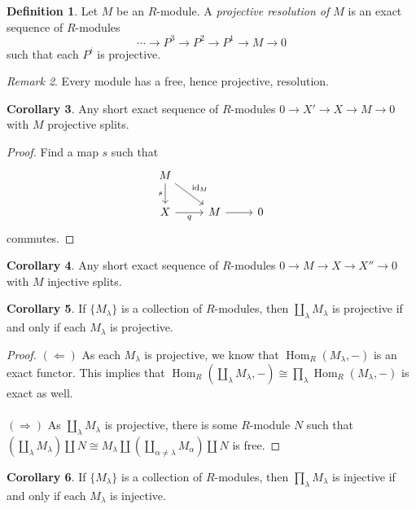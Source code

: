 \documentclass[10pt,letterpaper,cm]{nupset}
\theoremstyle{definition}
\newtheorem{definition}{Definition}[subsection]
\theoremstyle{theorem}
\newtheorem{corollary}[definition]{Corollary}
\theoremstyle{remark}
\newtheorem{remark}[definition]{Remark}
\newcommand{\1}{\mathbf{1}}
\newcommand{\0}{\vec 0}
\DeclareMathOperator{\id}{id}
\DeclareMathOperator{\Hom}{Hom}
\begin{document}
\begin{definition}
Let $M$ be an $R$-module. A \textit{projective resolution of $M$} is an exact sequence of $R$-modules $$\cdots \to P^3 \to P^2 \to P^1 \to M \to 0$$ such that each $P^i$ is projective.  
\end{definition}

\begin{remark}
Every module has a free, hence projective, resolution. 
\end{remark}

\begin{corollary}
Any short exact sequence of $R$-modules $0 \to X' \to X \to M \to 0$ with $M$ projective splits. 
\end{corollary}
\begin{proof}
Find a map $s$ such that
\[\begin{tikzcd}
M \arrow[rd, "\id_M"] \arrow[d, "s"'] &  &  \\
X \arrow[r, "q"'] & M \arrow[r] & 0
\end{tikzcd}
\] commutes. 
\end{proof}

\begin{corollary}
Any short exact sequence of $R$-modules $0 \to M \to X \to X'' \to 0$ with $M$ injective splits. 
\end{corollary}

\begin{corollary}
If $\{M_{\lambda}\}$ is a collection of $R$-modules, then $\coprod_{\lambda} M_{\lambda}$ is projective  if and only if each $M_{\lambda}$ is projective. 
\end{corollary}
\begin{proof}
$(\Longleftarrow)$ As each $M_{\lambda}$ is projective, we know that $\Hom_R(M_{\lambda}, -)$ is an exact functor. This implies that $\Hom_R(\coprod_{\lambda} M_{\lambda}, -) \cong \prod_{\lambda} \Hom_R(M_{\lambda}, -)$ is exact as well.
\\ \\ 
$(\Longrightarrow)$ As $\coprod_{\lambda} M_{\lambda}$ is projective, there is some $R$-module $N$ such that $(\coprod_{\lambda} M_{\lambda}) \coprod N \cong M_{\lambda} \coprod  (\coprod_{\alpha \ne \lambda} M_{\alpha})\coprod N$ is free.
\end{proof}

\begin{corollary}
If $\{M_{\lambda}\}$ is a collection of $R$-modules, then $\prod_{\lambda} M_{\lambda}$ is injective  if and only if each $M_{\lambda}$ is injective. 
\end{corollary}
\end{document}
